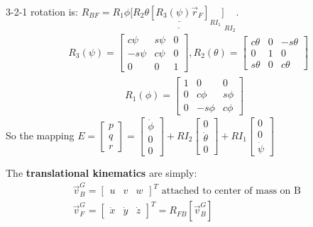 \documentclass[conference]{IEEEtran}
\begin{document}
\begin{itemize}
\begin{align*}
    \end{align*}
    3-2-1 rotation is: $R_{BF} = R_1{\phi}[\underline{R_2{\theta}\underline{[R_3(\psi)\vec{r}_F]}_{RI_1}]}_{RI_2}$.
    \begin{align*}
        & R_3(\psi) = \begin{bmatrix} c\psi & s\psi & 0 \\ -s\psi & c\psi & 0 \\ 0 & 0 & 1\end{bmatrix}, R_2(\theta) = \begin{bmatrix} c\theta & 0 & -s\theta \\ 0 & 1 & 0 \\ s\theta & 0 & c\theta\end{bmatrix}
    \end{align*}
    \begin{align*}
        R_1(\phi) = \begin{bmatrix} 1 & 0 & 0 \\ 0 & c\phi & s\phi \\ 0 & -s\phi & c\phi\end{bmatrix}
    \end{align*}
    So the mapping $E = \begin{bmatrix} p \\ q \\ r \end{bmatrix} = \begin{bmatrix} \dot{\phi} \\ 0 \\ 0 \end{bmatrix} + RI_2\begin{bmatrix}0 \\ \dot{\theta} \\ 0 \end{bmatrix} + RI_1\begin{bmatrix}0 \\ 0 \\ \dot{\psi}\end{bmatrix}$
\end{itemize}
The \textbf{translational kinematics} are simply:
\begin{align*}
    & \vec{v}^G_B = \begin{bmatrix} u & v & w\end{bmatrix}^T \text{ attached to center of mass on B } \\
    & \vec{v}^G_F = \begin{bmatrix} \dot{x} & \dot{y} & \dot{z} \end{bmatrix}^T = R_{FB} [\vec{v}^G_B]
\end{align*}
\end{document}
